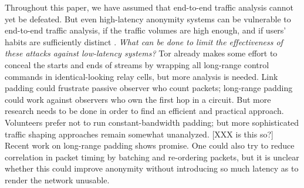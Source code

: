 \documentclass[times,10pt,twocolumn]{article}
\begin{document}
%

Throughout this paper, we have assumed that end-to-end traffic
analysis cannot yet be defeated.  But even high-latency anonymity
systems can be vulnerable to end-to-end traffic analysis, if the
traffic volumes are high enough, and if users' habits are sufficiently
distinct \cite{limits-open,statistical-disclosure}.  \emph{What can be
  done to limit the effectiveness of these attacks against low-latency
  systems?}  Tor already makes some effort to conceal the starts and
ends of streams by wrapping all long-range control commands in
identical-looking relay cells, but more analysis is needed.  Link
padding could frustrate passive observer who count packets; long-range
padding could work against observers who own the first hop in a
circuit.  But more research needs to be done in order to find an
efficient and practical approach.  Volunteers prefer not to run
constant-bandwidth padding; but more sophisticated traffic shaping
approaches remain somewhat unanalyzed. [XXX is this so?] Recent work
on long-range padding \cite{defensive-dropping} shows promise.  One
could also try to reduce correlation in packet timing by batching and
re-ordering packets, but it is unclear whether this could improve
anonymity without introducing so much latency as to render the
network unusable.
\end{document}

